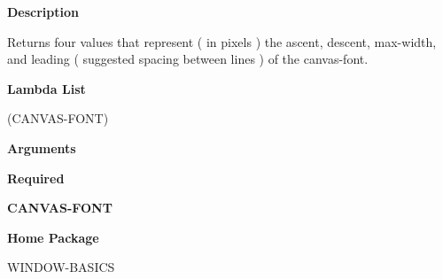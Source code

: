  
{\bf Description}

Returns four values that represent ( in pixels ) the ascent, descent, max-width, and leading ( suggested spacing between lines ) of the canvas-font.

 
{\bf Lambda List}

(CANVAS-FONT)

 
{\bf Arguments}


\beginhang
{\bf Required}\hspace{2em}
 
{\bf CANVAS-FONT}


 
\endhang
 
{\bf Home Package}

WINDOW-BASICS


